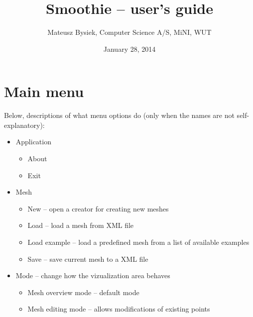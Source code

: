 \documentclass[a4paper,12pt]{article}
\begin{document}
\title{Smoothie -- user's guide}
\date{January 28, 2014}
\author{Mateusz Bysiek, Computer Science A/S, MiNI, WUT}
\maketitle

\section{Main menu}

Below, descriptions of what menu options do (only when the names are not self-explanatory):

\begin{itemize}

  \item Application

  \begin{itemize}

    \item About

    \item Exit 

  \end{itemize}

  \item Mesh

  \begin{itemize}

    \item New -- open a creator for creating new meshes

    \item Load -- load a mesh from XML file

    \item Load example -- load a predefined mesh from a list of available examples 

    \item Save -- save current mesh to a XML file

  \end{itemize}

  \item Mode -- change how the vizualization area behaves

  \begin{itemize}

    \item Mesh overview mode -- default mode

    \item Mesh editing mode -- allows modifications of existing points


\end{itemize}
\end{itemize}
\end{document}
